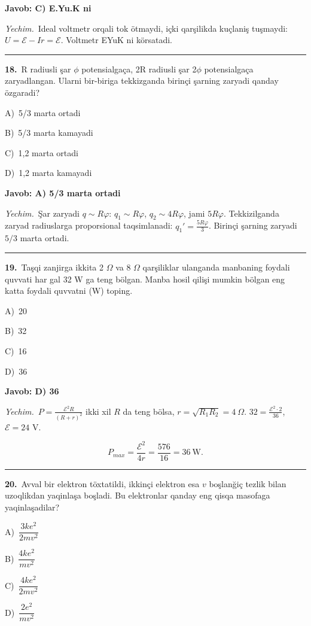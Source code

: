 \documentclass[11pt,a4paper]{article}
\newcommand{\opt}[2]{\hspace*{4mm}#1)\ #2\par}
\begin{document}
\noindent\colorbox{gray!12}{\parbox{\dimexpr\linewidth-2\fboxsep}{\textbf{Javob: C) E.Yu.K ni}}}\par\smallskip
\noindent\textit{Yechim.}\ Ideal voltmetr orqali tok ötmaydi, içki qarşilikda kuçlaniş tuşmaydi: $U=\mathcal E-Ir=\mathcal E$. Voltmetr EYuK ni körsatadi.\par\par\medskip\hrule\medskip
{}\noindent\begin{minipage}{\linewidth}
\textbf{18.}\ R radiusli şar $\phi$ potensialgaça, 2R radiusli şar 2$\phi$ potensialgaça zaryadlangan. Ularni bir-biriga tekkizganda birinçi şarning zaryadi qanday özgaradi?\par\smallskip
\opt{A}{5/3 marta ortadi}
\opt{B}{5/3 marta kamayadi}
\opt{C}{1,2 marta ortadi}
\opt{D}{1,2 marta kamayadi}
\end{minipage}\vspace{2pt}\par
\noindent\colorbox{gray!12}{\parbox{\dimexpr\linewidth-2\fboxsep}{\textbf{Javob: A) 5/3 marta ortadi}}}\par\smallskip
\noindent\textit{Yechim.}\ Şar zaryadi $q\sim R\varphi$: $q_1\sim R\varphi$, $q_2\sim4R\varphi$, jami $5R\varphi$. Tekkizilganda zaryad radiuslarga proporsional taqsimlanadi: $q_1'=\frac{5R\varphi}{3}$. Birinçi şarning zaryadi $5/3$ marta ortadi.\par\par\medskip\hrule\medskip
{}\noindent\begin{minipage}{\linewidth}
\textbf{19.}\ Taşqi zanjirga ikkita 2 $\Omega$ va 8 $\Omega$ qarşiliklar ulanganda manbaning foydali quvvati har gal 32 W ga teng bölgan. Manba hosil qilişi mumkin bölgan eng katta foydali quvvatni (W) toping.\par\smallskip
\opt{A}{20}
\opt{B}{32}
\opt{C}{16}
\opt{D}{36}
\end{minipage}\vspace{2pt}\par
\noindent\colorbox{gray!12}{\parbox{\dimexpr\linewidth-2\fboxsep}{\textbf{Javob: D) 36}}}\par\smallskip
\noindent\textit{Yechim.}\ $P=\frac{\mathcal E^2R}{(R+r)^2}$ ikki xil $R$ da teng bölsa, $r=\sqrt{R_1R_2}=4\ \Omega$. $32=\frac{\mathcal E^2\cdot2}{36}$, $\mathcal E=24$ V.\par
\[P_{max}=\frac{\mathcal E^2}{4r}=\frac{576}{16}=36\ \text{W}.\]\par\medskip\hrule\medskip
{}\noindent\begin{minipage}{\linewidth}
\textbf{20.}\ Avval bir elektron töxtatildi, ikkinçi elektron esa $v$ boşlanğiç tezlik bilan uzoqlikdan yaqinlaşa boşladi. Bu elektronlar qanday eng qisqa masofaga yaqinlaşadilar?\par\smallskip
\opt{A}{$\dfrac{3ke^2}{2mv^2}$}
\opt{B}{$\dfrac{4ke^2}{mv^2}$}
\opt{C}{$\dfrac{4ke^2}{2mv^2}$}
\opt{D}{$\dfrac{2e^2}{mv^2}$}
\end{minipage}\vspace{2pt}\par
\end{document}

